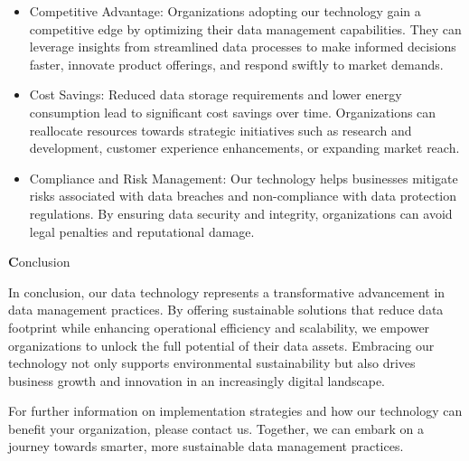 \begin{itemize}
\item Competitive Advantage: Organizations adopting our technology gain a competitive edge by optimizing their data management capabilities. They can leverage insights from streamlined data processes to make informed decisions faster, innovate product offerings, and respond swiftly to market demands.
\item Cost Savings: Reduced data storage requirements and lower energy consumption lead to significant cost savings over time. Organizations can reallocate resources towards strategic initiatives such as research and development, customer experience enhancements, or expanding market reach.
\item Compliance and Risk Management: Our technology helps businesses mitigate risks associated with data breaches and non-compliance with data protection regulations. By ensuring data security and integrity, organizations can avoid legal penalties and reputational damage.

\end{itemize}

{\textbf Conclusion}

In conclusion, our data technology represents a transformative advancement in data management practices. By offering sustainable solutions that reduce data footprint while enhancing operational efficiency and scalability, we empower organizations to unlock the full potential of their data assets. Embracing our technology not only supports environmental sustainability but also drives business growth and innovation in an increasingly digital landscape.

For further information on implementation strategies and how our technology can benefit your organization, please contact us. Together, we can embark on a journey towards smarter, more sustainable data management practices.